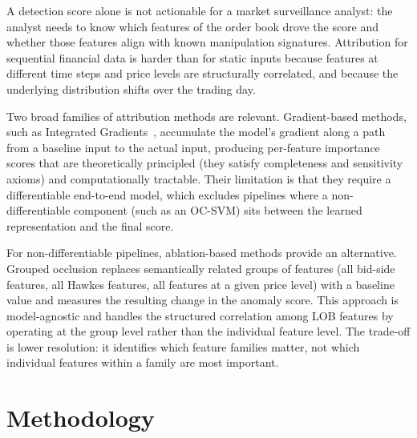 \documentclass[11pt]{report}
\begin{document}
A detection score alone is not actionable for a market surveillance analyst: the analyst needs to know which features of the order book drove the score and whether those features align with known manipulation signatures. Attribution for sequential financial data is harder than for static inputs because features at different time steps and price levels are structurally correlated, and because the underlying distribution shifts over the trading day.

Two broad families of attribution methods are relevant. Gradient-based methods, such as Integrated Gradients~\cite{sundararajan2017axiomaticattributiondeepnetworks}, accumulate the model's gradient along a path from a baseline input to the actual input, producing per-feature importance scores that are theoretically principled (they satisfy completeness and sensitivity axioms) and computationally tractable. Their limitation is that they require a differentiable end-to-end model, which excludes pipelines where a non-differentiable component (such as an OC-SVM) sits between the learned representation and the final score.

For non-differentiable pipelines, ablation-based methods provide an alternative. Grouped occlusion replaces semantically related groups of features (all bid-side features, all Hawkes features, all features at a given price level) with a baseline value and measures the resulting change in the anomaly score. This approach is model-agnostic and handles the structured correlation among LOB features by operating at the group level rather than the individual feature level. The trade-off is lower resolution: it identifies which feature families matter, not which individual features within a family are most important.


\chapter{Methodology}\label{chap:methodology}
\end{document}
